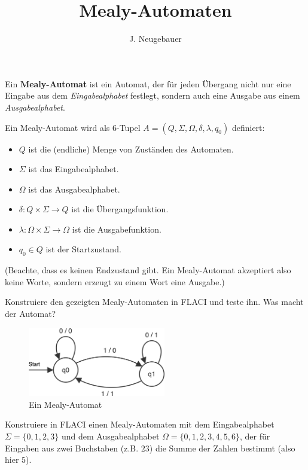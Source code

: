 \documentclass[10pt, a4paper]{scrartcl}
\author{J. Neugebauer}
\title{Mealy-Automaten}
\date{\Heute}
\begin{document}
\ReiheTitel

Ein \textbf{Mealy-Automat} ist ein Automat, der für jeden Übergang nicht nur eine Eingabe aus dem \emph{Eingabealphabet} festlegt, sondern auch eine Ausgabe aus einem \emph{Ausgabealphabet}.

Ein Mealy-Automat wird als 6-Tupel $A = (Q, \Sigma, \Omega, \delta, \lambda, q_0)$ definiert:
\begin{itemize}
	\item $Q$ ist die (endliche) Menge von Zuständen des Automaten.
	\item $\Sigma$ ist das Eingabealphabet.
	\item $\Omega$ ist das Ausgabealphabet.
	\item $\delta: Q\times \Sigma\rightarrow Q$ ist die Übergangsfunktion.
	\item $\lambda: \Omega\times \Sigma\rightarrow \Omega$ ist die Ausgabefunktion.
	\item $q_0\in Q$ ist der Startzustand.
\end{itemize}

(Beachte, dass es keinen Endzustand gibt. Ein Mealy-Automat akzeptiert also keine Worte, sondern erzeugt zu einem Wort eine Ausgabe.)

\begin{aufgabe}
	Konstruiere den gezeigten Mealy-Automaten in FLACI und teste ihn. Was macht der Automat?
	
	\begin{figure}[h]\centering
		\includegraphics[width=6cm]{Q1-LK-AB.4-Abb_Mealy_1}
		\caption{Ein Mealy-Automat}
	\end{figure}
\end{aufgabe}

\begin{aufgabe}
	Konstruiere in FLACI einen Mealy-Automaten mit dem Eingabealphabet $\Sigma = \{ 0, 1, 2, 3 \}$ und dem Ausgabealphabet $\Omega = \{ 0, 1, 2, 3, 4, 5, 6 \}$, der für Eingaben aus zwei Buchstaben (z.B. $23$) die Summe der Zahlen bestimmt (also hier $5$).
	
\end{aufgabe}
\end{document}

